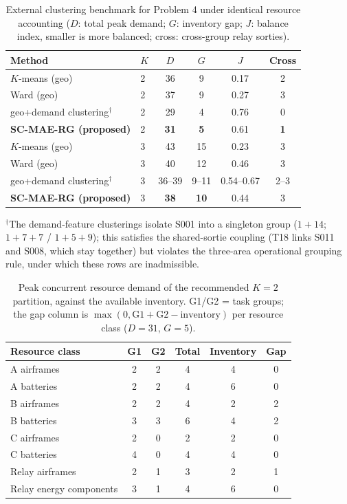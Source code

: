 \documentclass[journal]{IEEEtran}
\begin{document}
\begin{table}[t]
\centering
\footnotesize
\setlength{\tabcolsep}{4pt}
\caption{External clustering benchmark for Problem 4 under identical resource
accounting ($D$: total peak demand; $G$: inventory gap; $J$: balance index,
smaller is more balanced; cross: cross-group relay sorties).}
\label{tab:benchq4}
\begin{tabular}{llcccc}
\toprule
Method & $K$ & $D$ & $G$ & $J$ & Cross \\
\midrule
$K$-means (geo)               & 2 & 36 & 9  & 0.17 & 2 \\
Ward (geo)                    & 2 & 37 & 9  & 0.27 & 3 \\
geo+demand clustering$^{\dagger}$ & 2 & 29 & 4 & 0.76 & 0 \\
\textbf{SC-MAE-RG (proposed)} & 2 & \textbf{31} & \textbf{5} & 0.61 & \textbf{1} \\
\midrule
$K$-means (geo)               & 3 & 43 & 15 & 0.23 & 3 \\
Ward (geo)                    & 3 & 40 & 12 & 0.46 & 3 \\
geo+demand clustering$^{\dagger}$ & 3 & 36--39 & 9--11 & 0.54--0.67 & 2--3 \\
\textbf{SC-MAE-RG (proposed)} & 3 & \textbf{38} & \textbf{10} & 0.44 & 3 \\
\bottomrule
\end{tabular}

\vspace{2pt}
{\footnotesize $^{\dagger}$The demand-feature clusterings isolate S001 into a
singleton group ($1{+}14$; $1{+}7{+}7$ / $1{+}5{+}9$); this satisfies the
shared-sortie coupling (T18 links S011 and S008, which stay together) but
violates the three-area operational grouping rule, under which these rows are
inadmissible.}
\end{table}

\begin{table}[t]
\centering
\footnotesize
\setlength{\tabcolsep}{3pt}
\caption{Peak concurrent resource demand of the recommended $K{=}2$ partition,
against the available inventory. G1/G2 = task groups; the gap column is
$\max(0,\mathrm{G1}+\mathrm{G2}-\mathrm{inventory})$ per resource class
($D{=}31$, $G{=}5$).}
\label{tab:gap}
\begin{tabular}{lccccc}
\toprule
Resource class & G1 & G2 & Total & Inventory & Gap \\
\midrule
A airframes & 2 & 2 & 4 & 4 & 0 \\
A batteries & 2 & 2 & 4 & 6 & 0 \\
B airframes & 2 & 2 & 4 & 2 & 2 \\
B batteries & 3 & 3 & 6 & 4 & 2 \\
C airframes & 2 & 0 & 2 & 2 & 0 \\
C batteries & 4 & 0 & 4 & 4 & 0 \\
Relay airframes & 2 & 1 & 3 & 2 & 1 \\
Relay energy components & 3 & 1 & 4 & 6 & 0 \\
\bottomrule
\end{tabular}
\end{table}
\end{document}
